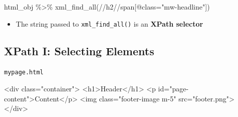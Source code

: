\documentclass[
  letterpaper,
  DIV=11,
  numbers=noendperiod,
  oneside]{scrreprt}
\newenvironment{Shaded}{\begin{snugshade}}{\end{snugshade}}
\newcommand{\ErrorTok}[1]{\textcolor[rgb]{0.68,0.00,0.00}{#1}}
\newcommand{\FunctionTok}[1]{\textcolor[rgb]{0.28,0.35,0.67}{#1}}
\newcommand{\KeywordTok}[1]{\textcolor[rgb]{0.00,0.23,0.31}{#1}}
\newcommand{\NormalTok}[1]{\textcolor[rgb]{0.00,0.23,0.31}{#1}}
\newcommand{\OtherTok}[1]{\textcolor[rgb]{0.00,0.23,0.31}{#1}}
\newcommand{\SpecialCharTok}[1]{\textcolor[rgb]{0.37,0.37,0.37}{#1}}
\newcommand{\StringTok}[1]{\textcolor[rgb]{0.13,0.47,0.30}{#1}}
\providecommand{\tightlist}{%
  \setlength{\itemsep}{0pt}\setlength{\parskip}{0pt}}\usepackage{longtable,booktabs,array}
\begin{document}
\begin{Shaded}
\begin{Highlighting}[]
\NormalTok{html\_obj }\SpecialCharTok{\%\textgreater{}\%} \FunctionTok{xml\_find\_all}\NormalTok{(}\StringTok{\textquotesingle{}//h2//span[@class="mw{-}headline"]\textquotesingle{}}\NormalTok{)}
\end{Highlighting}
\end{Shaded}

\begin{itemize}
\tightlist
\item
  The string passed to \texttt{xml\_find\_all()} is an \textbf{XPath
  selector}
\end{itemize}


\hypertarget{xpath-i-selecting-elements}{%
\subsection{XPath I: Selecting
Elements}\label{xpath-i-selecting-elements}}

\begin{codelisting}

\caption{\texttt{mypage.html}}

\begin{Shaded}
\begin{Highlighting}[]
\KeywordTok{\textless{}div} \ErrorTok{class}\OtherTok{=}\StringTok{"container"}\KeywordTok{\textgreater{}}
  \KeywordTok{\textless{}h1\textgreater{}}\NormalTok{Header}\KeywordTok{\textless{}/h1\textgreater{}}
  \KeywordTok{\textless{}p} \ErrorTok{id}\OtherTok{=}\StringTok{"page{-}content"}\KeywordTok{\textgreater{}}\NormalTok{Content}\KeywordTok{\textless{}/p\textgreater{}}
  \KeywordTok{\textless{}img} \ErrorTok{class}\OtherTok{=}\StringTok{"footer{-}image m{-}5"} \ErrorTok{src}\OtherTok{=}\StringTok{"footer.png"}\KeywordTok{\textgreater{}}
\KeywordTok{\textless{}/div\textgreater{}}
\end{Highlighting}
\end{Shaded}

\end{codelisting}
\end{document}

